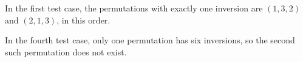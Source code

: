 In the first test case, the permutations with exactly one inversion are $(1,3,2)$ and $(2,1,3)$, in this order.

In the fourth test case, only one permutation has six inversions, so the second such permutation does not exist.
